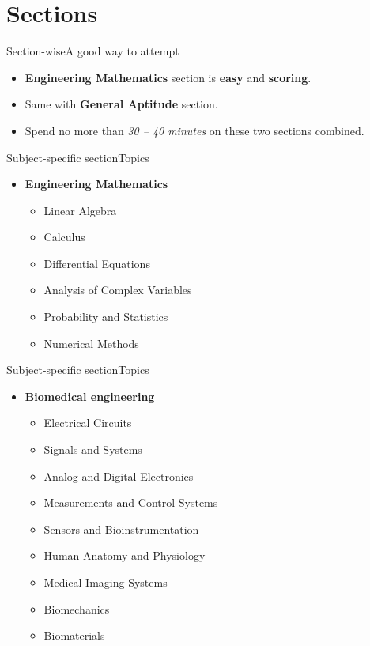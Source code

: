\documentclass[handout]{beamer}
\begin{document}
\section{Sections}
\begin{frame}{Section-wise}{A good way to attempt}
    \begin{itemize}
        \item \textbf{Engineering Mathematics} section is \textbf{easy} and \textbf{scoring}.
        \item Same with \textbf{General Aptitude} section.
        \item Spend no more than \emph{30 -- 40 minutes} on these two sections combined.
    \end{itemize}
\end{frame}

\begin{frame}{Subject-specific section}{Topics}
    \begin{itemize}
        \item \textbf{Engineering Mathematics}
              \begin{itemize}
                  \item Linear Algebra
                  \item Calculus
                  \item Differential Equations
                  \item Analysis of Complex Variables
                  \item Probability and Statistics
                  \item Numerical Methods
              \end{itemize}
    \end{itemize}
\end{frame}

\begin{frame}{Subject-specific section}{Topics}
    \begin{itemize}
        \item \textbf{Biomedical engineering}
              \begin{itemize}
                  \item Electrical Circuits
                  \item Signals and Systems
                  \item Analog and Digital Electronics
                  \item Measurements and Control Systems
                  \item Sensors and Bioinstrumentation
                  \item Human Anatomy and Physiology
                  \item Medical Imaging Systems
                  \item Biomechanics
                  \item Biomaterials
              \end{itemize}
    \end{itemize}
\end{frame}
\end{document}
